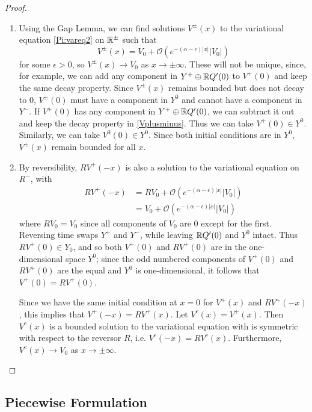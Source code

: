 \documentclass[thesis.tex]{subfiles}
\begin{document}
\begin{lemma:varadjsolutions}
\begin{proof}
\begin{enumerate}
\item Using the Gap Lemma, we can find solutions $V^\pm(x)$ to the variational equation \eqref{Pi:vareq2} on ${\mathbb R}^\pm$ such that
\begin{equation}\label{Vplusminus}
V^\pm(x) = V_0 + \mathcal{O}(e^{-(\alpha - \epsilon)|x|}|V_0|)
\end{equation}
for some $\epsilon > 0$, so $V^\pm(x) \rightarrow V_0$ as $x \rightarrow \pm \infty$. These will not be unique, since, for example, we can add any component in $Y^+ \oplus {\mathbb R} Q'(0)$ to $V^+(0)$ and keep the same decay property. Since $V^\pm(x)$ remains bounded but does not decay to 0, $V^\pm(0)$ must have a component in $Y^0$ and cannot have a component in $Y^-$. If $V^+(0)$ has any component in $Y^+ \oplus {\mathbb R} Q'(0)$, we can subtract it out and keep the decay property in \eqref{Vplusminus}. Thus we can take $V^+(0) \in Y^0$. Similarly, we can take $V^0(0) \in Y^0$. Since both initial conditions are in $Y^0$, $V^\pm(x)$ remain bounded for all $x$.

\item By reversibility, $RV^+(-x)$ is also a solution to the variational equation on $R^-$, with 
\begin{align*}
R V^+(-x) &= R V_0 + \mathcal{O}(e^{-(\alpha - \epsilon)|x|}|V_0|) \\
&= V_0 + \mathcal{O}(e^{-(\alpha - \epsilon)|x|}|V_0|)
\end{align*}
where $R V_0 = V_0$ since all components of $V_0$ are 0 except for the first. Reversing time swaps $Y^+$ and $Y^-$, while leaving ${\mathbb R} Q'(0)$ and $Y^0$ intact. Thus 
$RV^+(0) \in Y_0$, and so both $V^+(0)$ and $RV^+(0)$ are in the one-dimensional space $Y^0$; since the odd numbered components of $V^+(0)$ and $RV^+(0)$ are the equal and $Y^0$ is one-dimensional, it follows that $V^+(0) = RV^+(0)$.

Since we have the same initial condition at $x = 0$ for $V^+(x)$ and $RV^+(-x)$, this implies that $V^+(-x) = RV^+(x)$. Let $V^c(x) = V^+(x)$. Then $V^c(x)$ is a bounded solution to the variational equation with is symmetric with respect to the reversor $R$, i.e. $V^c(-x) = RV^c(x)$. Furthermore, $V^c(x) \rightarrow V_0$ as $x \rightarrow \pm \infty$.
\end{enumerate}
\end{proof}
\end{lemma:varadjsolutions}

\subsection{Piecewise Formulation}
\end{document}

